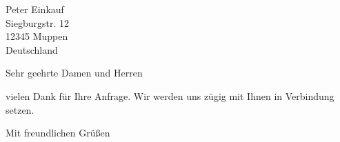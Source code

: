 \documentclass[pgerletter,fontsize=11pt]{scrlttr2}
\begin{document}


\begin{letter}{%
	Peter Einkauf\\
	Siegburgstr. 12\\
	12345 Muppen\\
	Deutschland\\
	\vspace{1.5cm}
}
\opening{Sehr geehrte Damen und Herren}

vielen Dank für Ihre Anfrage. Wir werden uns zügig mit Ihnen in Verbindung setzen.


\closing{Mit freundlichen Grüßen}
\end{letter}
\end{document}
